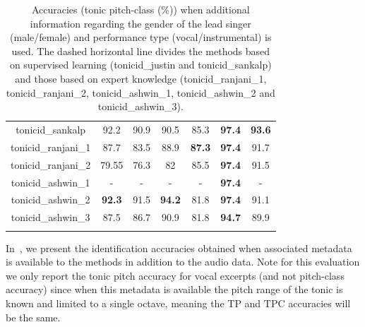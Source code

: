 {\begin{table}
\begin{centering}
\begin{tabular}{ c | c  c  c  c  c  c }
		\acrshort{tonicid_sankalp} & 92.2 & 90.9 & 90.5 & 85.3 & \textbf{97.4} & \textbf{93.6}  \\
		\hdashline
		\acrshort{tonicid_ranjani_1} & 87.7 & 83.5 & 88.9 & \textbf{87.3} &\textbf{ 97.4} & 91.7 \\
		
		\acrshort{tonicid_ranjani_2} & 79.55 & 76.3 & 82 & 85.5 & \textbf{97.4} & 91.5 \\
		
		\acrshort{tonicid_ashwin_1} & - & - &- & - & \textbf{97.4} & - \\
		
		\acrshort{tonicid_ashwin_2} & \textbf{92.3} & 91.5 & \textbf{94.2} & 81.8 & \textbf{97.4} & 91.1 \\
		
		\acrshort{tonicid_ashwin_3} & 87.5 & 86.7 & 90.9 & 81.8 & \textbf{94.7} & 89.9 \\
\tablebot		
	\end{tabular}
\par	\end{centering}
	\caption[Tonic identification accuracies of seven methods on six different datasets using both audio and editorial metadata]{Accuracies (tonic pitch-class (\%)) when additional information regarding the gender of the lead singer (male/female) and performance type (vocal/instrumental) is used. The dashed horizontal line divides the methods based on supervised learning (\acrshort{tonicid_justin} and \acrshort{tonicid_sankalp}) and those based on expert knowledge (\acrshort{tonicid_ranjani_1}, \acrshort{tonicid_ranjani_2}, \acrshort{tonicid_ashwin_1}, \acrshort{tonicid_ashwin_2} and \acrshort{tonicid_ashwin_3}).}
	\label{tab:tonic_identification_accuracy_with_gender_info}
\end{table}

In~, we present the identification accuracies obtained when associated metadata is available to the methods in addition to the audio data. Note for this evaluation we only report the tonic pitch
accuracy for vocal excerpts (and not pitch-class accuracy) since when this metadata is available the pitch range of the tonic is known and limited to a
single octave, meaning the TP and TPC accuracies will be the same.

}

